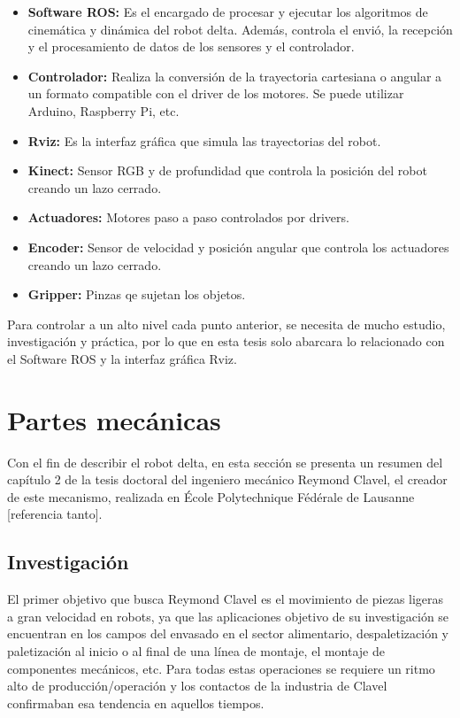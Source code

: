     \begin{itemize}
        \item \textbf{Software ROS:} Es el encargado de procesar y ejecutar los algoritmos de cinemática y dinámica del robot delta. Además, controla el envió, la recepción y el procesamiento de datos de los sensores y el controlador.
        \item \textbf{Controlador:} Realiza la conversión de la trayectoria cartesiana o angular a un formato compatible con el driver de los motores. Se puede utilizar Arduino, Raspberry Pi, etc.
        \item \textbf{Rviz:} Es la interfaz gráfica que simula las trayectorias del robot.
        \item \textbf{Kinect:} Sensor RGB y de profundidad que controla la posición del robot creando un lazo cerrado.
        \item \textbf{Actuadores:} Motores paso a paso controlados por drivers.
        \item \textbf{Encoder:} Sensor de velocidad y posición angular que controla los actuadores creando un lazo cerrado.
        \item \textbf{Gripper:} Pinzas qe sujetan los objetos.
    \end{itemize}
    
    Para controlar a un alto nivel cada punto anterior, se necesita de mucho estudio, investigación y práctica, por lo que en esta tesis solo abarcara lo relacionado con el Software ROS y la interfaz gráfica Rviz.  
    
    \newpage

    
\section{Partes mecánicas}
    Con el fin de describir el robot delta, en esta sección se presenta un resumen del capítulo 2 de la tesis doctoral del ingeniero mecánico Reymond Clavel, el creador de este mecanismo, realizada en École Polytechnique Fédérale de Lausanne [referencia tanto]. 

    
    \subsection{Investigación}
    El primer objetivo que busca Reymond Clavel es el movimiento de piezas ligeras a gran velocidad en robots, ya que las aplicaciones objetivo de su investigación se encuentran en los campos del envasado en el sector alimentario, despaletización y paletización al inicio o al final de una línea de montaje, el montaje de componentes mecánicos, etc. Para todas estas operaciones se requiere un ritmo alto de producción/operación y los contactos de la industria de Clavel confirmaban esa tendencia en aquellos tiempos.
    
